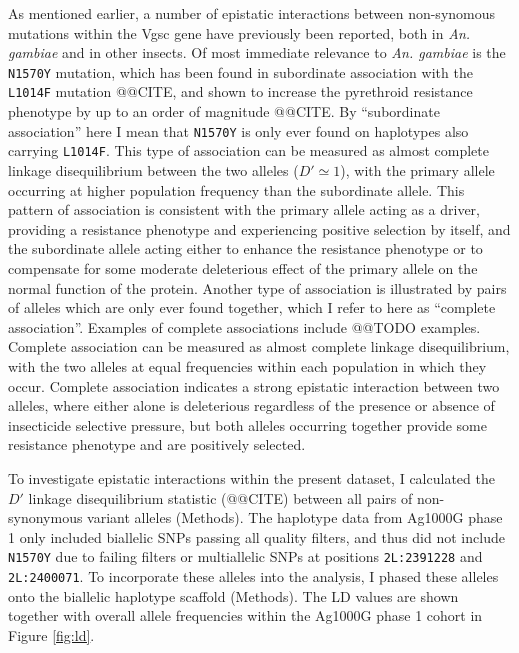 \documentclass[a4paper,11pt,abstracton,hidelinks]{scrartcl}
\begin{document}
%
As mentioned earlier, a number of epistatic interactions between non-synomous mutations within the Vgsc gene have previously been reported, both in \textit{An. gambiae} and in other insects.
%
Of most immediate relevance to \textit{An. gambiae} is the \texttt{N1570Y} mutation, which has been found in subordinate association with the \texttt{L1014F} mutation @@CITE, and shown to increase the pyrethroid resistance phenotype by up to an order of magnitude @@CITE.
%
By ``subordinate association'' here I mean that \texttt{N1570Y} is only ever found on haplotypes also carrying \texttt{L1014F}.
%
This type of association can be measured as almost complete linkage disequilibrium between the two alleles ($D' \simeq 1$), with the primary allele occurring at higher population frequency than the subordinate allele.
%
This pattern of association is consistent with the primary allele acting as a driver, providing a resistance phenotype and experiencing positive selection by itself, and the subordinate allele acting either to enhance the resistance phenotype or to compensate for some moderate deleterious effect of the primary allele on the normal function of the protein.
%
Another type of association is illustrated by pairs of alleles which are only ever found together, which I refer to here as ``complete association''.
%
Examples of complete associations include @@TODO examples.
%
Complete association can be measured as almost complete linkage disequilibrium, with the two alleles at equal frequencies within each population in which they occur.
%
Complete association indicates a strong epistatic interaction between two alleles, where either alone is deleterious regardless of the presence or absence of insecticide selective pressure, but both alleles occurring together provide some resistance phenotype and are positively selected.


%
To investigate epistatic interactions within the present dataset, I calculated the $D'$ linkage disequilibrium statistic (@@CITE) between all pairs of non-synonymous variant alleles (Methods).
%
The haplotype data from Ag1000G phase 1 only included biallelic SNPs passing all quality filters, and thus did not include \texttt{N1570Y} due to failing filters or multiallelic SNPs at positions \texttt{2L:2391228} and \texttt{2L:2400071}.
%
To incorporate these alleles into the analysis, I phased these alleles onto the biallelic haplotype scaffold (Methods).
%
The LD values are shown together with overall allele frequencies within the Ag1000G phase 1 cohort in Figure \ref{fig:ld}.
\end{document}
